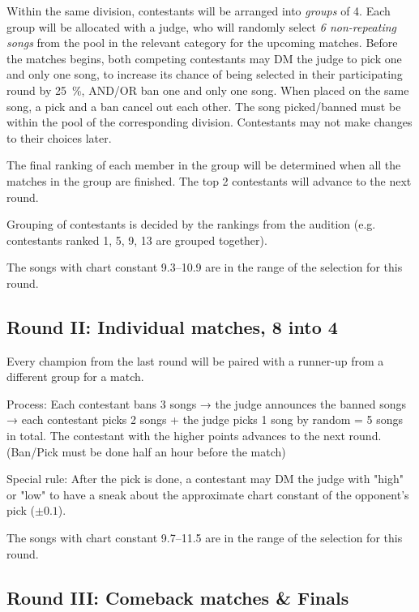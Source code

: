 \documentclass{article}
\newcommand{\alert}[1]{{\color{red} #1}}
\newcommand{\srbgcolor}{red!40}
\newcommand{\specialrule}[1]{\colorbox{\srbgcolor}{\parbox{\textwidth}{#1}}}
\begin{document}
Within the same division,
contestants will be arranged into \emph{groups} of 4.
Each group will be allocated with a judge,
who will randomly select \emph{6 non-repeating songs}
from the pool in the relevant category
for the upcoming matches.
Before the matches begins,
both competing contestants
may DM the judge to pick one and only one song,
to increase its chance of being selected
in their participating round by \qty{25}{\percent},
AND/OR ban one and only one song.
When placed on the same song,
a pick and a ban cancel out each other.
The song picked/banned must be within
the pool of the corresponding division.
Contestants may not make changes to their choices later.

The final ranking of each member in the group will be determined  %
when all the matches in the group are finished.
The top 2 contestants will advance to the next round.

Grouping of contestants is decided
by the rankings from the audition
(e.g. contestants ranked 1, 5, 9, 13
are grouped together).

\alert{
	The songs with chart constant 9.3--10.9
	are in the range of the selection for this round.
}

\subsection  {Round II: Individual matches, 8 into 4}

Every champion  %
from the last round
will be paired with a runner-up
from a different group for a match.

Process: Each contestant bans 3 songs →
the judge announces the banned songs →
each contestant picks 2 songs + the judge picks 1 song by random = 5 songs in total.
The contestant with the higher points advances to the next round.
(Ban/Pick must be done half an hour before the match)

\specialrule{
	Special rule: After the pick is done,
	a contestant may DM the judge with "high" or "low"
	to have a sneak about
	the approximate chart constant of the opponent's pick
	($\pm0.1$).
}

\nopagebreak

\alert{
	The songs with chart constant 9.7--11.5
	are in the range of the selection for this round.
}

\subsection{Round III: Comeback %
	matches \& Finals}
\end{document}
